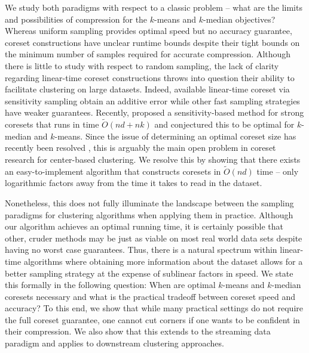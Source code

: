 We study both paradigms with respect to a classic problem -- what are the limits and possibilities of compression for the $k$-means and $k$-median objectives?
Whereas uniform sampling provides optimal speed but no accuracy guarantee, coreset constructions have
unclear runtime bounds despite their tight bounds on the minimum number of samples required for accurate compression. Although there is little to study with respect to random
sampling, the lack of clarity regarding linear-time coreset constructions throws into question their ability to facilitate clustering on large datasets. Indeed,
available linear-time coreset via sensitivity sampling obtain an additive error \cite{BachemL018} while other fast sampling strategies
\cite{kmeans_sublinear_bachem16} have weaker guarantees. Recently, \cite{DSWY22} proposed a sensitivity-based method for strong coresets that runs in time
$\tilde{O}(nd + nk)$ and conjectured this to be optimal for $k$-median and $k$-means.  Since the issue of determining an optimal coreset size has recently
been resolved \cite{CSS21,CLSSS22,HLW23}, this is arguably the main open problem in coreset research for center-based clustering. We resolve this by showing that
there exists an easy-to-implement algorithm that constructs coresets in $\tilde{O}(nd)$ time -- only logarithmic factors away from the time it takes to read in
the dataset.

Nonetheless, this does not fully illuminate the landscape between the sampling paradigms for clustering algorithms when applying them in practice. Although our algorithm achieves an optimal
running time, it is certainly possible that other, cruder methods may be just as viable on most real world data sets despite having no worst case guarantees.
Thus, there is a natural spectrum within linear-time algorithms where obtaining more information about the dataset allows for a better
sampling strategy at the expense of sublinear factors in speed. We state this formally in the following question: When are optimal $k$-means and $k$-median
coresets necessary and what is the practical tradeoff between coreset speed and accuracy? To this end, we show that while many practical settings do not require
the full coreset guarantee, one cannot cut corners if one wants to be confident in their compression. We also
show that this extends to the streaming data paradigm and applies to downstream clustering approaches.
